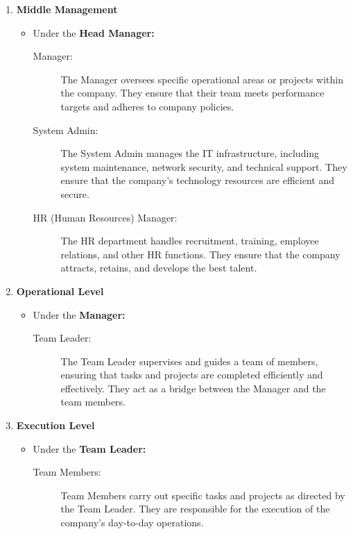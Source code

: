 \begin{enumerate}
            \item \textbf{Middle Management}
            \begin{itemize}
                \item Under the \textbf{Head Manager:}
            \begin{description}
                \item[Manager: ] The Manager oversees specific operational areas or projects within the company. They ensure that their team meets performance targets and adheres to company policies.
                \item[System Admin: ] The System Admin manages the IT infrastructure, including system maintenance, network security, and technical support. They ensure that the company’s technology resources are efficient and secure.
                \item[HR (Human Resources) Manager:] The HR department handles recruitment, training, employee relations, and other HR functions. They ensure that the company attracts, retains, and develops the best talent.
            \end{description}
            \end{itemize}
            \item \textbf{Operational Level}
            \begin{itemize}
                \item Under the \textbf{Manager:}
            \begin{description}
                \item[Team Leader: ] The Team Leader supervises and guides a team of members, ensuring that tasks and projects are completed efficiently and effectively. They act as a bridge between the Manager and the team members.
            \end{description}
            \end{itemize}
            \item \textbf{Execution Level}
            \begin{itemize}
                \item Under the \textbf{Team Leader:}
            \begin{description}
                \item[Team Members:] Team Members carry out specific tasks and projects as directed by the Team Leader. They are responsible for the execution of the company’s day-to-day operations.
            \end{description}
            \end{itemize}
        \end{enumerate}

